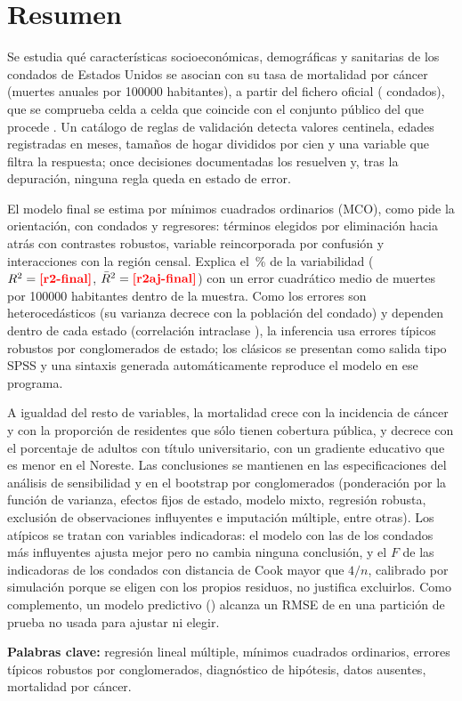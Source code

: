 \chapter*{Resumen}

Se estudia qué características socioeconómicas, demográficas y sanitarias de los condados de
Estados Unidos se asocian con su tasa de mortalidad por cáncer (muertes anuales por
\num{100000} habitantes), a partir del fichero oficial 
( condados), que se comprueba celda a celda que coincide con el conjunto
público del que procede \parencite{rippner2017}. Un catálogo de  reglas de
validación detecta valores centinela, edades registradas en meses, tamaños de hogar divididos
por cien y una variable que filtra la respuesta; once decisiones documentadas los resuelven y,
tras la depuración, ninguna regla queda en estado de error.

El modelo final se estima por mínimos cuadrados ordinarios (MCO), como pide la orientación,
con  condados y  regresores:  términos elegidos
por eliminación hacia atrás con contrastes robustos,  variable reincorporada
por confusión y  interacciones con la región censal. Explica el
\,\% de la variabilidad ($R^2 = \res{r2-final}$, $\bar R^2 = \res{r2aj-final}$)
con un error cuadrático medio de  muertes por \num{100000} habitantes dentro de
la muestra. Como los errores son heterocedásticos (su varianza decrece con la población del
condado) y dependen dentro de cada estado (correlación intraclase ), la
inferencia usa errores típicos robustos por conglomerados de estado; los clásicos se presentan
como salida tipo SPSS y una sintaxis generada automáticamente reproduce el modelo en ese
programa.

A igualdad del resto de variables, la mortalidad crece con la incidencia de cáncer y con la
proporción de residentes que sólo tienen cobertura pública, y decrece con el porcentaje de
adultos con título universitario, con un gradiente educativo que es menor en el Noreste. Las
conclusiones se mantienen en las  especificaciones del análisis de
sensibilidad y en el bootstrap por conglomerados (ponderación por la función
de varianza, efectos fijos de estado, modelo mixto, regresión robusta, exclusión de observaciones
influyentes e imputación múltiple, entre otras). Los atípicos se tratan con variables indicadoras:
el modelo con las de los  condados más influyentes ajusta mejor pero no cambia
ninguna conclusión, y el $F$ de las indicadoras de los  condados con distancia de
Cook mayor que $4/n$, calibrado por simulación porque se eligen con los propios residuos, no
justifica excluirlos. Como complemento, un modelo
predictivo () alcanza un RMSE de  en una partición de
prueba no usada para ajustar ni elegir.

\par\medskip\noindent\textbf{Palabras clave:} regresión lineal múltiple, mínimos cuadrados
ordinarios, errores típicos robustos por conglomerados, diagnóstico de hipótesis, datos
ausentes, mortalidad por cáncer.
